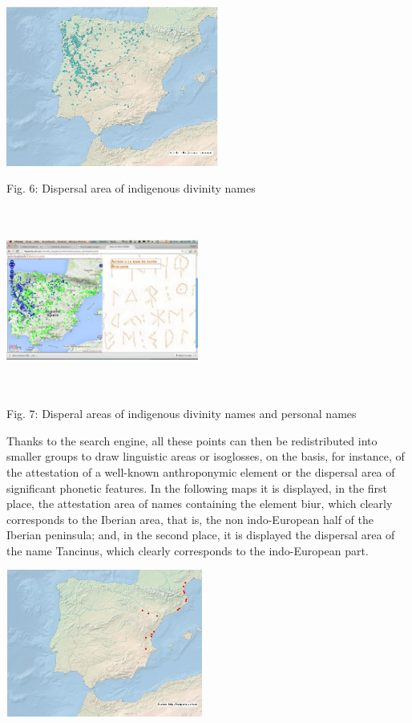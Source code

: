 \documentclass[amsthm,ebook]{saparticle}
\begin{document}
 \includegraphics[width=6.98cm,height=5.262cm]{EpigraphyandonomasticsinHesperiadatabanktemplate-img006.png} 

Fig. 6: Dispersal area of indigenous divinity names

 \includegraphics[width=6.32cm,height=6.045cm]{EpigraphyandonomasticsinHesperiadatabanktemplate-img007.png} 

Fig. 7: Disperal areas of indigenous divinity names and personal names

Thanks to the search engine, all these points can then be redistributed into smaller groups to draw linguistic areas or
isoglosses, on the basis, for instance, of the attestation of a well-known anthroponymic element or the dispersal area
of significant phonetic features. In the following maps it is displayed, in the first place, the attestation area of
names containing the element biur, which clearly corresponds to the Iberian area, that is, the non indo-European half
of the Iberian peninsula; and, in the second place, it is displayed the dispersal area of the name Tancinus, which
clearly corresponds to the indo-European part.

 \includegraphics[width=6.491cm,height=4.833cm]{EpigraphyandonomasticsinHesperiadatabanktemplate-img008.jpg} 
\end{document}
